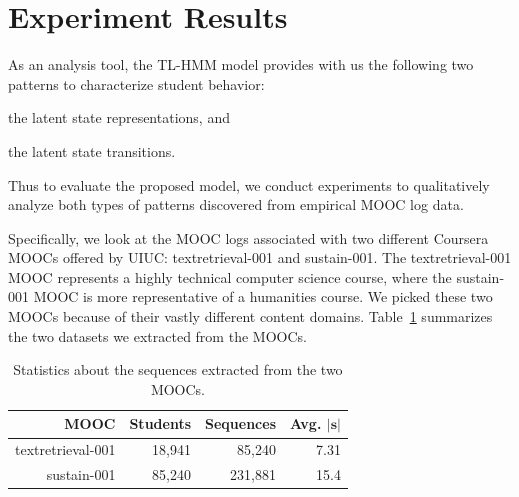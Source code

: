 \newcommand{\textretrieval}{textretrieval-001}

\newcommand{\sustain}{sustain-001}

\newcommand{\UIUC}{UIUC}

\section{Experiment Results}
As an analysis tool, the TL-HMM model provides with us the following two
patterns to characterize student behavior:
\begin{enumerate*}[label=(\arabic*)]
  \item the latent state representations, and
  \item the latent state transitions.
\end{enumerate*}
Thus to evaluate the proposed model, we conduct experiments to
qualitatively analyze both types of patterns discovered from empirical MOOC
log data.

Specifically, we look at the MOOC logs associated with two different
Coursera MOOCs offered by \UIUC{}: \textretrieval{} and \sustain{}.  The
\textretrieval{} MOOC represents a highly technical computer science course,
where the \sustain{} MOOC is more representative of a humanities course. We
picked these two MOOCs because of their vastly different content domains.
Table~\ref{table:datasets} summarizes the two datasets we extracted from
the MOOCs.

\begin{table}
  \begin{center}
    \begin{tabular}{rrrr}
      \textbf{MOOC} & \textbf{Students} & \textbf{Sequences} & \textbf{Avg.
      $|\mathbf{s}|$}\\\hline
      \textretrieval{} & 18,941 & 85,240 & 7.31\\
      \sustain{} & 85,240 & 231,881 & 15.4
    \end{tabular}
    \caption{Statistics about the sequences extracted from the two MOOCs.}
    \label{table:datasets}
  \end{center}
\end{table}

